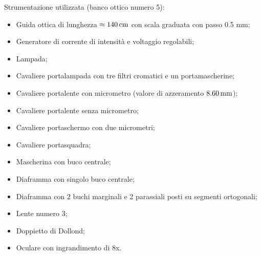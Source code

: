 Strumentazione utilizzata (banco ottico numero 5):
\begin{itemize}
\item Guida ottica di lunghezza $\approx 140 \,\mathrm{cm}$ con scala graduata con passo 0.5 mm;
\item Generatore di corrente di intensità e voltaggio regolabili;
\item Lampada;
\item Cavaliere portalampada con tre filtri cromatici e un portamascherine;
\item Cavaliere portalente con micrometro (valore di azzeramento $8.60 \,\mathrm{mm}$);
\item Cavaliere portalente senza micrometro;
\item Cavaliere portaschermo con due micrometri;
\item Cavaliere portasquadra;
\item Mascherina con buco centrale;
\item Diaframma con singolo buco centrale;
\item Diaframma con 2 buchi marginali e 2 parassiali posti su segmenti ortogonali;
\item Lente numero 3;
\item Doppietto di Dollond;
\item Oculare con ingrandimento di 8x.
\end{itemize}
